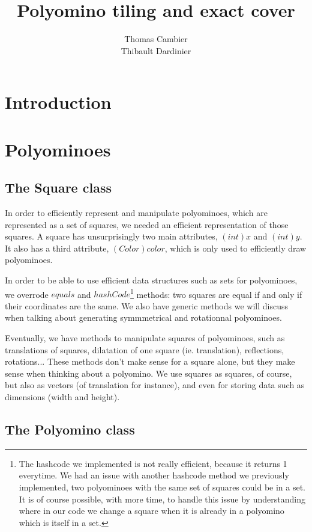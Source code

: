 \documentclass[12pt]{article}
\title{Polyomino tiling and exact cover}
\author{Thomas Cambier\\Thibault Dardinier}
\begin{document}
\maketitle
\tableofcontents
\newpage

\section*{Introduction}

\section{Polyominoes}

\subsection{The Square class}

In order to efficiently represent and manipulate polyominoes, which are represented as a set of squares, we needed an efficient representation of those squares.
A square has unsurprisingly two main attributes, $(int) x$ and $(int) y$.
It also has a third attribute, $(Color) color$, which is only used to efficiently draw polyominoes.

In order to be able to use efficient data structures such as sets for polyominoes, we overrode $equals$ and $hashCode$\footnote{The hashcode we implemented is not really efficient, because it returns 1 everytime.
We had an issue with another hashcode method we previously implemented, two polyominoes with the same set of squares could be in a set.
It is of course possible, with more time, to handle this issue by understanding where in our code we change a square when it is already in a polyomino which is itself in a set.}
 methods: two squares are equal if and only if their coordinates are the same.
We also have generic methods we will discuss when talking about generating symmmetrical
and rotationnal polyominoes.

Eventually, we have methods to manipulate squares of polyominoes, such as translations of squares, dilatation of one square (ie. translation), reflections, rotations...
These methods don’t make sense for a square alone, but they make sense when thinking about a polyomino.
We use squares as squares, of course, but also as vectors (of translation for instance), and even for storing data such as dimensions (width and height).


\subsection{The Polyomino class}
\end{document}
